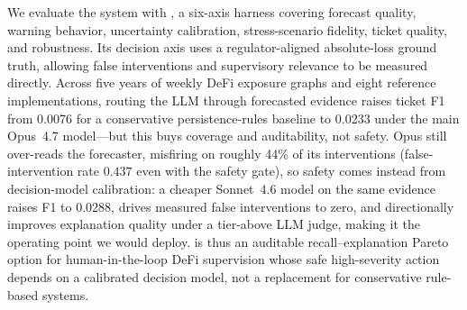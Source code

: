 We evaluate the system with \benchname{}, a six-axis harness covering forecast quality, warning behavior, uncertainty calibration, stress-scenario fidelity, ticket quality, and robustness. Its decision axis uses a regulator-aligned absolute-loss ground truth, allowing false interventions and supervisory relevance to be measured directly. Across five years of weekly DeFi exposure graphs and eight reference implementations, routing the LLM through forecasted evidence raises ticket F1 from 0.0076 for a conservative persistence-rules baseline to 0.0233 under the main Opus~4.7 model---but this buys coverage and auditability, not safety. Opus still over-reads the forecaster, misfiring on roughly 44\% of its interventions (false-intervention rate $0.437$ even with the safety gate), so safety comes instead from decision-model calibration: a cheaper Sonnet~4.6 model on the same evidence raises F1 to 0.0288, drives measured false interventions to zero, and directionally improves explanation quality under a tier-above LLM judge, making it the operating point we would deploy. \sysname{} is thus an auditable recall--explanation Pareto option for human-in-the-loop DeFi supervision whose safe high-severity action depends on a calibrated decision model, not a replacement for conservative rule-based systems.

